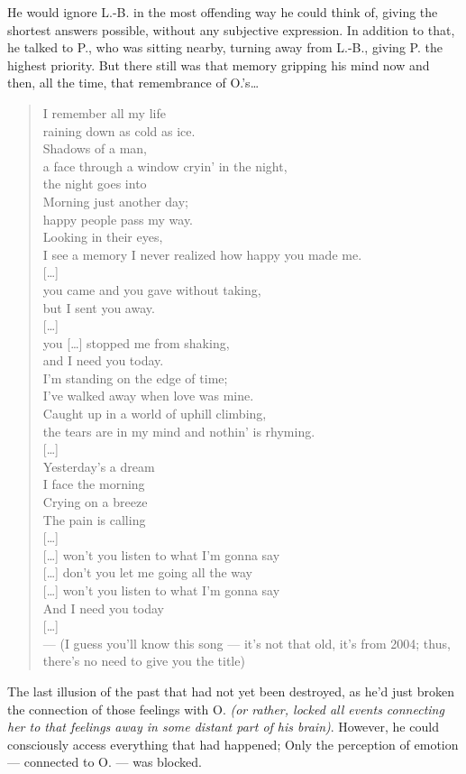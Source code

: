 He would ignore L.-B. in the most offending way he could think of, giving the shortest answers possible, without any subjective expression. 
In addition to that, he talked to P., who was sitting nearby, turning away from L.-B., giving P. the highest priority. 
But there still was that memory gripping his mind now and then, all the time, that remembrance of O.'s\ldots
\begin{quote}
I remember all my life \\
raining down as cold as ice. \\
Shadows of a man, \\
a face through a window cryin' in the night, \\
the night goes into \\
Morning just another day; \\
happy people pass my way. \\
Looking in their eyes, \\
I see a memory I never realized how happy you made me. \\
{[\ldots]}\\[1\baselineskip]
you came and you gave without taking, \\
but I sent you away. \\
{[\ldots]}\\[1\baselineskip]
you {[\ldots]} stopped me from shaking, \\
and I need you today. \\[1\baselineskip]
I'm standing on the edge of time; \\
I've walked away when love was mine. \\
Caught up in a world of uphill climbing, \\
the tears are in my mind and nothin' is rhyming. \\[1\baselineskip]
{[\ldots]}\\[1\baselineskip]
Yesterday's a dream \\
I face the morning \\
Crying on a breeze \\
The pain is calling \\
{[\ldots]}\\[1\baselineskip]
{[\ldots]} won't you listen to what I'm gonna say \\
{[\ldots]} don't you let me going all the way \\
{[\ldots]} won't you listen to what I'm gonna say \\
And I need you today \\
{[\ldots]}\\
--- (I guess you'll know this song --- it's not that old, it's from 2004; thus, there's no need to give you the title)
\end{quote}
The last illusion of the past that had not yet been destroyed, as he'd just broken the connection of those feelings with O. \emph{(or rather, locked all events connecting her to that feelings away in some distant part of his brain)}. However, he could consciously access everything that had happened; Only the perception of emotion --- connected to O. --- was blocked.

